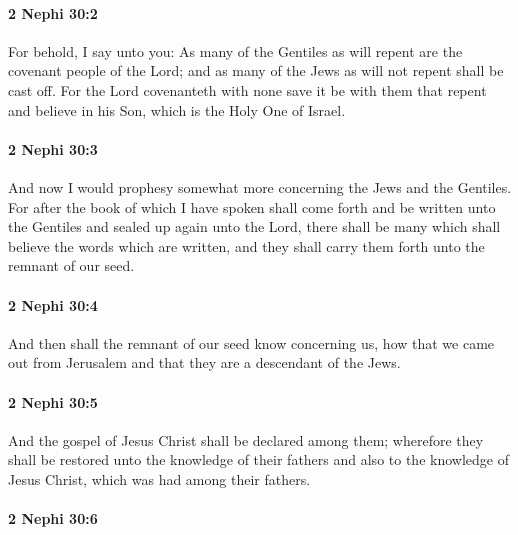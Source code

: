 		\paragraph{2 Nephi 30:2} %
			\label{2NEPHI-30-2}

			For behold, I say unto you:
			As many of the Gentiles as will repent are the covenant people of the Lord;
			and as many of the Jews as will not repent shall be cast off.
			For the Lord covenanteth with none
			save it be with them that repent
			and believe in his Son, which is the Holy One of Israel.

		\paragraph{2 Nephi 30:3} %
			\label{2NEPHI-30-3}

			And now I would prophesy somewhat more concerning the Jews and the Gentiles.
			For after the book of which I have spoken shall come forth
			and be written unto the Gentiles
			and sealed up again unto the Lord,
			there shall be many which shall believe the words which are written,
			and they shall carry them forth unto the remnant of our seed.

		\paragraph{2 Nephi 30:4} %
			\label{2NEPHI-30-4}

			And then shall the remnant of our seed know concerning us,
			how that we came out from Jerusalem
			and that they are a descendant of the Jews.

		\paragraph{2 Nephi 30:5} %
			\label{2NEPHI-30-5}

			And the gospel of Jesus Christ shall be declared among them;
			wherefore they shall be restored unto the knowledge of their fathers
			and also to the knowledge of Jesus Christ, which was had among their fathers.

		\paragraph{2 Nephi 30:6} %
			\label{2NEPHI-30-6}

